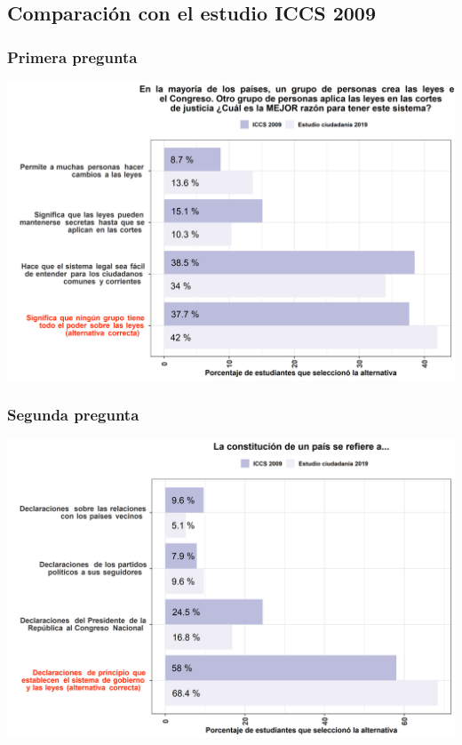 \documentclass[
  14pt,
]{book}
\begin{document}
\hypertarget{comparaciuxf3n-con-el-estudio-iccs-2009}{%
\subsection{Comparación con el estudio ICCS 2009}\label{comparaciuxf3n-con-el-estudio-iccs-2009}}

\hypertarget{primera-pregunta}{%
\subsubsection{Primera pregunta}\label{primera-pregunta}}

\begin{center}\includegraphics[width=52.49in]{images/graph_p1} \end{center}

\hypertarget{segunda-pregunta-1}{%
\subsubsection{Segunda pregunta}\label{segunda-pregunta-1}}

\begin{center}\includegraphics[width=52.49in]{images/graph_p2} \end{center}
\end{document}
